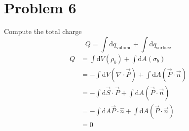 \documentclass[letter, 10pts]{article}
\begin{document}
\section*{Problem 6} 
Compute the total charge
\[
	Q = \int \mathrm{d} q_{\text{volume}}  + \int \mathrm{d} q_{\text{surface}} 
\]
\begin{align*}
Q &= 
\int \mathrm{d} V (\rho_b) + 
\int \mathrm{d} A (\sigma_b) \\
  &=
- \int \mathrm{d} V (\nabla \cdot \vec{P}) + 
\int \mathrm{d} A (\vec{P} \cdot \vec{n})\\
&= -  \int \mathrm{d} \vec{S} \cdot  \vec{P} + 
\int \mathrm{d} A (\vec{P} \cdot \vec{n})\\
&= - \int \mathrm{d} A  \vec{P} \cdot \hat{n} + 
\int \mathrm{d} A (\vec{P} \cdot \vec{n})\\ 
&= 0 \\
\end{align*}
\end{document}
